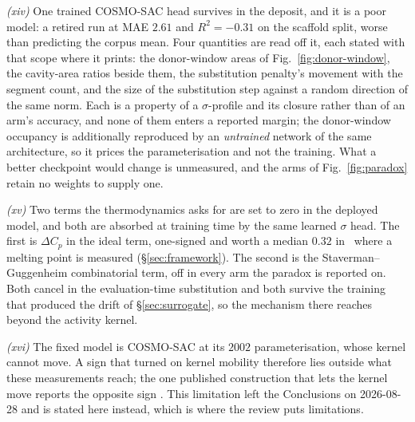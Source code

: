 \emph{(xiv)} One trained COSMO-SAC head survives in the deposit, and it is a poor model: a retired run at
MAE $2.61$ and $R^2=-0.31$ on the scaffold split, worse than predicting the corpus mean. Four
quantities are read off it, each stated with that scope where it prints: the donor-window areas of
Fig.~\ref{fig:donor-window}, the cavity-area ratios beside them, the substitution penalty's movement
with the segment count, and the size of the substitution step against a random direction of the same
norm. Each is a property of a $\sigma$-profile and its closure rather than of an arm's accuracy, and
none of them enters a reported margin; the donor-window occupancy is additionally reproduced by an
\emph{untrained} network of the same architecture, so it prices the parameterisation and not the
training. What a better checkpoint would change is unmeasured, and the arms of
Fig.~\ref{fig:paradox} retain no weights to supply one.

\emph{(xv)} Two terms the thermodynamics asks for are set to zero in the deployed model, and both are
absorbed at training time by the same learned $\sigma$ head. The first is $\Delta C_p$ in the ideal
term, one-signed and worth a median $0.32$ in \lnx\ where a melting point is measured
(\S\ref{sec:framework}). The second is the Staverman--Guggenheim combinatorial term, off in every
arm the paradox is reported on. Both cancel in the evaluation-time substitution and both survive the
training that produced the drift of \S\ref{sec:surrogate}, so the mechanism there reaches beyond the
activity kernel.

\emph{(xvi)} The fixed model is COSMO-SAC at its $2002$ parameterisation, whose kernel cannot move.
A sign that turned on kernel mobility therefore lies outside what these measurements reach; the one
published construction that lets the kernel move reports the opposite sign \cite{yang2025tennet}.
This limitation left the Conclusions on 2026-08-28 and is stated here instead, which is where the
review puts limitations.


